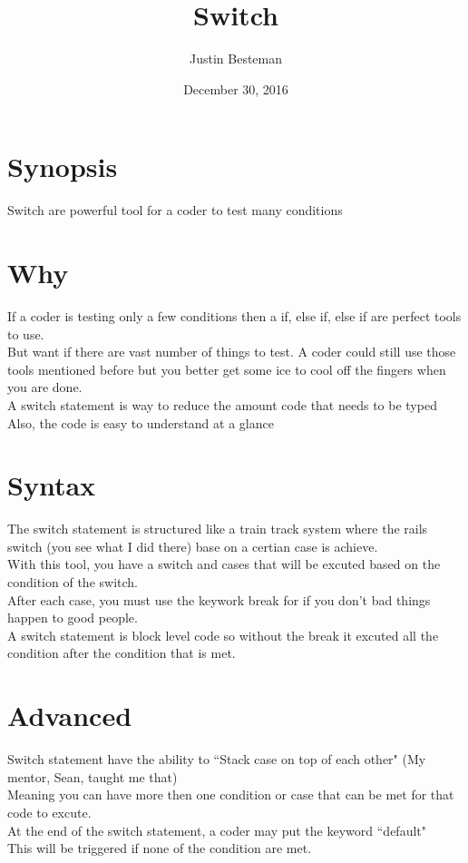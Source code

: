 \documentclass[12pt, letterpaper]{article}
\title{Switch}
\author{Justin Besteman}
\date{December 30, 2016}
\begin{document}
\maketitle


\section*{Synopsis}

Switch are powerful tool for a coder to test many conditions

\section*{Why}

If a coder is testing only a few conditions then a if, else if, else if are perfect tools to use. \\
But want if there are vast number of things to test. A coder could still use those tools mentioned before 
but you better get some ice to cool off the fingers when you are done.\\
A switch statement is way to reduce the amount code that needs to be typed \\
Also, the code is easy to understand at a glance

\section*{Syntax}

The switch statement is structured like a train track system where the rails switch (you see what I did there) base on a certian case is achieve. \\
With this tool, you have a switch and cases that will be excuted based on the condition of the switch. \\
After each case, you must use the keywork break for if you don't bad things happen to good people.\\
A switch statement is block level code so without the break it excuted all the condition after the condition that is met.

\section*{Advanced}

Switch statement have the ability to ``Stack case on top of each other" (My mentor, Sean, taught me that) \\
Meaning you can have more then one condition or case that can be met for that code to excute. \\
At the end of the switch statement, a coder may put the keyword ``default" \\
This will be triggered if none of the condition are met. 
\end{document}
